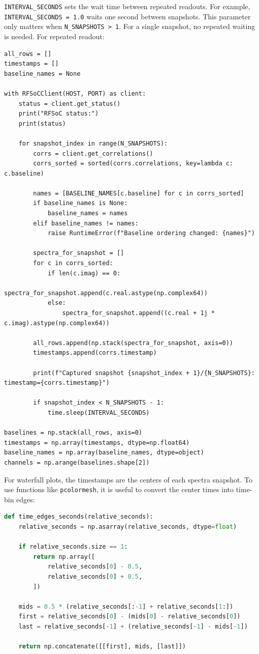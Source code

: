 \documentclass[12pt]{extarticle}
\begin{document}
\noindent \texttt{INTERVAL\_SECONDS} sets the wait time between repeated readouts. For example, \texttt{INTERVAL\_SECONDS = 1.0} waits one second between snapshots. This parameter only matters when \texttt{N\_SNAPSHOTS > 1}. For a single snapshot, no repeated waiting is needed.
For repeated readout:
\begin{lstlisting}
all_rows = []
timestamps = []
baseline_names = None

with RFSoCClient(HOST, PORT) as client:
    status = client.get_status()
    print("RFSoC status:")
    print(status)

    for snapshot_index in range(N_SNAPSHOTS):
        corrs = client.get_correlations()
        corrs_sorted = sorted(corrs.correlations, key=lambda c: c.baseline)

        names = [BASELINE_NAMES[c.baseline] for c in corrs_sorted]
        if baseline_names is None:
            baseline_names = names
        elif baseline_names != names:
            raise RuntimeError(f"Baseline ordering changed: {names}")

        spectra_for_snapshot = []
        for c in corrs_sorted:
            if len(c.imag) == 0:
                spectra_for_snapshot.append(c.real.astype(np.complex64))
            else:
                spectra_for_snapshot.append((c.real + 1j * c.imag).astype(np.complex64))

        all_rows.append(np.stack(spectra_for_snapshot, axis=0))
        timestamps.append(corrs.timestamp)

        print(f"Captured snapshot {snapshot_index + 1}/{N_SNAPSHOTS}: timestamp={corrs.timestamp}")

        if snapshot_index < N_SNAPSHOTS - 1:
            time.sleep(INTERVAL_SECONDS)

baselines = np.stack(all_rows, axis=0)
timestamps = np.array(timestamps, dtype=np.float64)
baseline_names = np.array(baseline_names, dtype=object)
channels = np.arange(baselines.shape[2])
\end{lstlisting}

For waterfall plots, the timestamps are the centers of each spectra snapshot. To use functions like \texttt{pcolormesh}, it is useful to convert the center times into time-bin edges:
\begin{lstlisting}[language=Python]
def time_edges_seconds(relative_seconds):
    relative_seconds = np.asarray(relative_seconds, dtype=float)

    if relative_seconds.size == 1:
        return np.array([
            relative_seconds[0] - 0.5,
            relative_seconds[0] + 0.5,
        ])

    mids = 0.5 * (relative_seconds[:-1] + relative_seconds[1:])
    first = relative_seconds[0] - (mids[0] - relative_seconds[0])
    last = relative_seconds[-1] + (relative_seconds[-1] - mids[-1])

    return np.concatenate([[first], mids, [last]])
\end{lstlisting}
\end{document}
